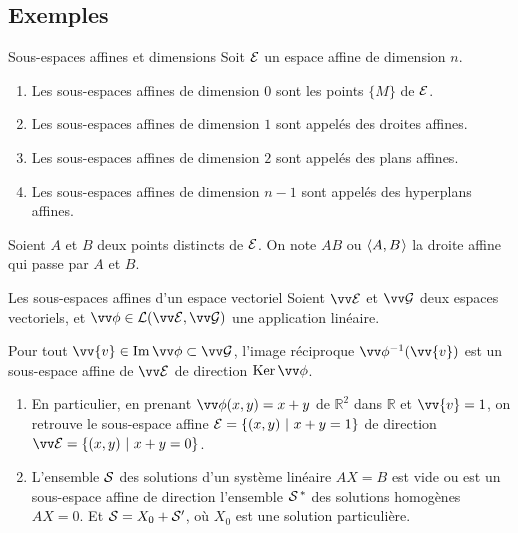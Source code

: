 \documentclass[bigger]{m53beamer}
\begin{document}
\subsection{Exemples}
  \begin{frame}{Sous-espaces affines et dimensions}
    Soit $\mathcal{E}$ un espace affine de dimension $n$.
    \begin{enumerate}[<+(1)->]
      \item Les sous-espaces affines de dimension $0$ sont les points $\{M\}$ de $\mathcal{E}$.
      \item Les sous-espaces affines de dimension $1$ sont appelés \alert{des droites affines}.
      \item Les sous-espaces affines de dimension $2$ sont appelés \alert{des plans affines}.
      \item Les sous-espaces affines de dimension $n-1$ sont appelés \alert{des hyperplans affines}.
    \end{enumerate}\pause

    Soient $A$ et $B$ deux points distincts de $\mathcal{E}$. On note $AB$ ou $\langle{A,B}\kern.07em\rangle$ la droite affine qui passe par $A$ et $B$.
  \end{frame}
  \begin{frame}{Les sous-espaces affines d'un espace vectoriel}
    Soient $\ev{E}$ et $\ev{G}$ deux espaces vectoriels, et $\vv\phi \in \mathcal{L}(\ev{E},\ev{G})$ une application linéaire.\pause\\
    \begin{proposition}
      Pour tout $\vv{v}\in\im\vv\phi\subset\ev{G}$, l'image réciproque $\vv\phi^{-1}(\vv{v})$ est un sous-espace affine de $\ev{E}$ de direction $\ker{\vv\phi}$.
    \end{proposition}
    \begin{enumerate}[<+(1)->]
      \item En particulier, en prenant $\vv\phi(x,y)=x+y$ de $\mathbb{R}^{2}$ dans $\mathbb{R}$ et $\vv{v}=1$, on retrouve le sous-espace affine $\mathcal{E}=\{(x,y)\ |\ x+y=1 \}$ de direction $\ev{E}=\{(x,y)\ |\ x+y=0 \}$.
      \item L'ensemble $\mathcal{S}$ des solutions d'un système linéaire $AX=B$ est vide ou est un sous-espace affine de direction l'ensemble $\mathcal{S^{\,\ast}}$ des solutions homogènes $AX=0$. Et $\mathcal{S}=X_{0}+\mathcal{S}'$, où $X_{0}$ est une solution particulière.
    \end{enumerate}
  \end{frame}
\end{document}
